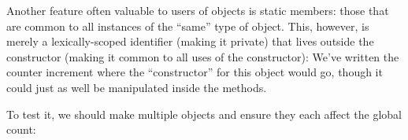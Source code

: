 
Another feature often valuable to users of objects is static members: those that
are common to all instances of the “same” type of object. This, however, is
merely a lexically-scoped identifier (making it private) that lives outside the
constructor (making it common to all uses of the constructor):
We’ve written the counter increment where the “constructor” for this object
would go, though it could just as well be manipulated inside the methods.

To test it, we should make multiple objects and ensure they each affect the
global count:
